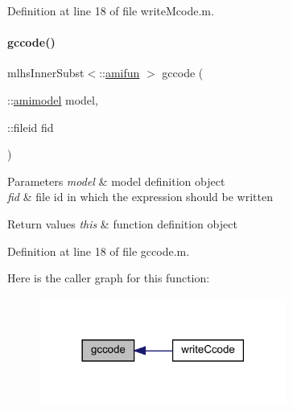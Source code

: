 Definition at line 18 of file write\+Mcode.\+m.

\mbox{\label{classamifun_a05444f498e657a0010f6b539bc9c6596}} 
\paragraph{\texorpdfstring{gccode()}{gccode()}}
{\footnotesize\ttfamily mlhs\+Inner\+Subst$<$\+::\mbox{\hyperlink{classamifun}{amifun}} $>$ gccode (\begin{DoxyParamCaption}\item[{\+::\mbox{\hyperlink{classamimodel}{amimodel}}}]{model,  }\item[{\+::fileid}]{fid }\end{DoxyParamCaption})}


\begin{DoxyParams}{Parameters}
{\em model} & model definition object \\
\hline
{\em fid} & file id in which the expression should be written\\
\hline
\end{DoxyParams}

\begin{DoxyRetVals}{Return values}
{\em this} & function definition object \\
\hline
\end{DoxyRetVals}


Definition at line 18 of file gccode.\+m.

Here is the caller graph for this function\+:
\nopagebreak
\begin{figure}[H]
\begin{center}
\leavevmode
\includegraphics[width=230pt]{classamifun_a05444f498e657a0010f6b539bc9c6596_icgraph}
\end{center}
\end{figure}
\mbox{\label{classamifun_a1cb97b695ab609e1655ec1067b140b70}} 
